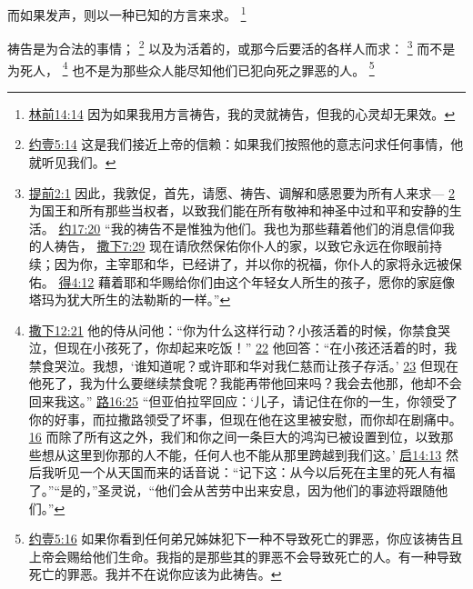 \documentclass[12pt, a4paper, oneside]{ctexart}
\newcounter{parnum}[section]
\newcommand{\N}{%
   \noindent\refstepcounter{parnum}%
    \makebox[\parindent][l]{\textbf{\arabic{parnum}.}}}
\begin{document}
	而如果发声，则以一种已知的方言来求。
	\footnote {
		\href{https://biblehub.com/1_corinthians/14-14.htm}{林前14:14} 因为如果我用方言祷告，我的灵就祷告，但我的心灵却无果效。
	}

\N 祷告是为合法的事情；
	\footnote {
		\href{https://biblehub.com/1_john/5-14.htm}{约壹5:14} 这是我们接近上帝的信赖：如果我们按照他的意志问求任何事情，他就听见我们。
	}
	以及为活着的，或那今后要活的各样人而求：
	\footnote {
		\href{https://biblehub.com/1_timothy/2-1.htm}{提前2:1} 因此，我敦促，首先，请愿、祷告、调解和感恩要为所有人来求---
		\href{https://biblehub.com/1_timothy/2-2.htm}{2} 为国王和所有那些当权者，以致我们能在所有敬神和神圣中过和平和安静的生活。
		\href{https://biblehub.com/john/17-20.htm}{约17:20} “我的祷告不是惟独为他们。我也为那些藉着他们的消息信仰我的人祷告，
		\href{https://biblehub.com/2_samuel/7-29.htm}{撒下7:29} 现在请欣然保佑你仆人的家，以致它永远在你眼前持续；因为你，主宰耶和华，已经讲了，并以你的祝福，你仆人的家将永远被保佑。
		\href{https://biblehub.com/ruth/4-12.htm}{得4:12} 藉着耶和华赐给你们由这个年轻女人所生的孩子，愿你的家庭像塔玛为犹大所生的法勒斯的一样。”
	}
	而不是为死人，
	\footnote {
		\href{https://biblehub.com/2_samuel/12-21.htm}{撒下12:21} 他的侍从问他：“你为什么这样行动？小孩活着的时候，你禁食哭泣，但现在小孩死了，你却起来吃饭！”
		\href{https://biblehub.com/2_samuel/12-22.htm}{22} 他回答：“在小孩还活着的时，我禁食哭泣。我想，‘谁知道呢？或许耶和华对我仁慈而让孩子存活。’
		\href{https://biblehub.com/2_samuel/12-23.htm}{23} 但现在他死了，我为什么要继续禁食呢？我能再带他回来吗？我会去他那，他却不会回来我这。”
		\href{https://biblehub.com/luke/16-25.htm}{路16:25} “但亚伯拉罕回应：‘儿子，请记住在你的一生，你领受了你的好事，而拉撒路领受了坏事，但现在他在这里被安慰，而你却在剧痛中。
		\href{https://biblehub.com/luke/16-26.htm}{16} 而除了所有这之外，我们和你之间一条巨大的鸿沟已被设置到位，以致那些想从这里到你那的人不能，任何人也不能从那里跨越到我们这。’
		\href{https://biblehub.com/revelation/14-13.htm}{启14:13} 然后我听见一个从天国而来的话音说：“记下这：从今以后死在主里的死人有福了。”“是的，”圣灵说，“他们会从苦劳中出来安息，因为他们的事迹将跟随他们。”
	}
	也不是为那些众人能尽知他们已犯向死之罪恶的人。
	\footnote {
		\href{https://biblehub.com/1_john/5-16.htm}{约壹5:16} 如果你看到任何弟兄姊妹犯下一种不导致死亡的罪恶，你应该祷告且上帝会赐给他们生命。我指的是那些其的罪恶不会导致死亡的人。有一种导致死亡的罪恶。我并不在说你应该为此祷告。
	}
\end{document}
